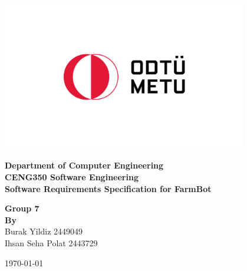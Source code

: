 \begin{titlepage}
   \begin{center}

       \includegraphics[width=0.8\textwidth]{Figures/metu_logo.png}
       \vspace{0.0cm}
     
            
        \textbf{\LARGE Department of  Computer Engineering} \\
        \vspace{0.5cm}
        \textbf{\LARGE CENG350 Software Engineering}\\
        \vspace{0.5cm} 
        \textbf{\LARGE Software Requirements Specification for FarmBot} \\
        \vspace{1.5cm} 
 

        \textbf{Group 7}\\
       \textbf{\textbf{By}} \\Burak Yildiz 2449049 \\ Ihsan Seha Polat 2443729 \\ 
       

       \vspace{1.5cm}
            
    
\vspace{0.5cm}
            


\today            
   \end{center}
\end{titlepage}